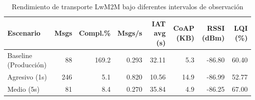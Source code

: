 
\begin{table}[htbp]
\centering
\caption{Rendimiento de transporte LwM2M bajo diferentes intervalos de observaci\'on}
\label{tab:lwm2m-benchmark}
\begin{tabular}{lrrrrrrr}
\toprule
\textbf{Escenario} & \textbf{Msgs} & \textbf{Compl.\%} & \textbf{Msgs/s} & \textbf{IAT avg (s)} & \textbf{CoAP (KB)} & \textbf{RSSI (dBm)} & \textbf{LQI (\%)} \\
\midrule
Baseline (Producci\'on) & 88 & 169.2 & 0.293 & 32.11 & 5.3 & -86.80 & 60.40 \\
Agresivo (1s) & 246 & 5.1 & 0.820 & 10.56 & 14.9 & -86.99 & 52.77 \\
Medio (5s) & 81 & 8.4 & 0.270 & 35.84 & 4.9 & -86.25 & 67.00 \\
\bottomrule
\end{tabular}
\end{table}
